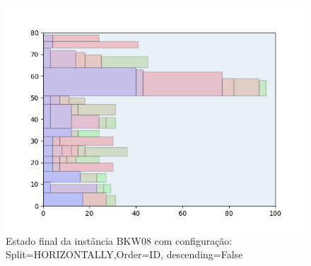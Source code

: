 \begin{figure}[H]
    \centering
    \caption[]{Estado final da instância BKW08 com configuração: Split=HORIZONTALLY,Order=ID, descending=False}
    \label{fig:bkw08-horizontally-id-false}
    \includegraphics[scale=0.5]{output/figures/bkw/bkw08/horizontally/id/false/00}
\end{figure}
